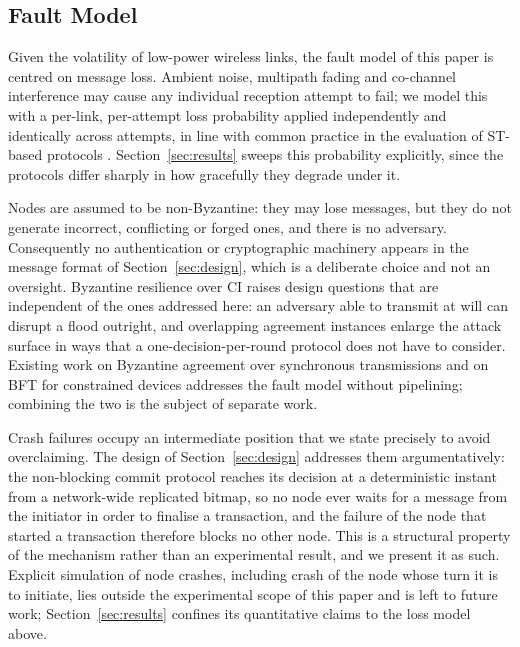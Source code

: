 \documentclass[journal]{IEEEtran}
\newcommand{\CI}{CI}                      %
\begin{document}
\subsection{Fault Model}
\label{sec:model-fault}

Given the volatility of low-power wireless links, the fault model of this
paper is centred on message loss. Ambient noise, multipath fading and
co-channel interference may cause any individual reception attempt to
fail; we model this with a per-link, per-attempt loss probability applied
independently and identically across attempts, in line with common
practice in the evaluation of ST-based protocols \cite{alnahas17a2}.
Section~\ref{sec:results} sweeps this probability explicitly, since the
protocols differ sharply in how gracefully they degrade under it.

Nodes are assumed to be non-Byzantine: they may lose messages, but they do
not generate incorrect, conflicting or forged ones, and there is no
adversary. Consequently no authentication or cryptographic machinery
appears in the message format of Section~\ref{sec:design}, which is a
deliberate choice and not an oversight. Byzantine resilience over \CI{}
raises design questions that are independent of the ones addressed here:
an adversary able to transmit at will can disrupt a flood outright, and
overlapping agreement instances enlarge the attack surface in ways that a
one-decision-per-round protocol does not have to consider. Existing work
on Byzantine agreement over synchronous transmissions
\cite{goyal22reli} and on BFT for constrained devices
\cite{boehm24tinybft} addresses the fault model without pipelining;
combining the two is the subject of separate work.

Crash failures occupy an intermediate position that we state precisely to
avoid overclaiming. The design of Section~\ref{sec:design} addresses them
argumentatively: the non-blocking commit protocol reaches its decision at
a deterministic instant from a network-wide replicated bitmap, so no node
ever waits for a message from the initiator in order to finalise a
transaction, and the failure of the node that started a transaction
therefore blocks no other node. This is a structural property of the
mechanism rather than an experimental result, and we present it as such.
Explicit simulation of node crashes, including crash of the node whose
turn it is to initiate, lies outside the experimental scope of this paper
and is left to future work; Section~\ref{sec:results} confines its
quantitative claims to the loss model above.
\end{document}
